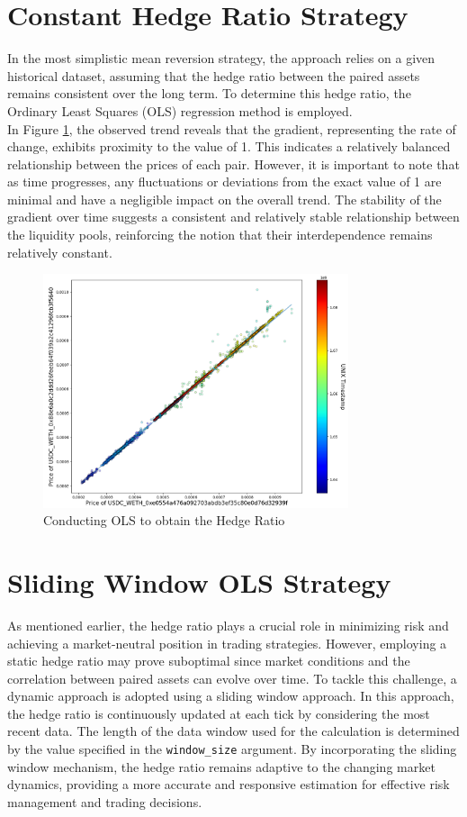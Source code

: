 \section{Constant Hedge Ratio Strategy}
In the most simplistic mean reversion strategy, the approach relies on a given historical dataset, assuming that the hedge ratio between the paired assets remains consistent over the long term. To determine this hedge ratio, the Ordinary Least Squares (OLS) regression method is employed.
\\[3mm]
In Figure \ref{fig:f1}, the observed trend reveals that the gradient, representing the rate of change, exhibits proximity to the value of 1. This indicates a relatively balanced relationship between the prices of each pair. However, it is important to note that as time progresses, any fluctuations or deviations from the exact value of 1 are minimal and have a negligible impact on the overall trend. The stability of the gradient over time suggests a consistent and relatively stable relationship between the liquidity pools, reinforcing the notion that their interdependence remains relatively constant.
\begin{figure}[!htb]
    \centering
    \includegraphics[width=0.8\textwidth]{project/Images/simple_hedge_ratio.png}
    \caption{Conducting OLS to obtain the Hedge Ratio \label{fig:f1}}
\end{figure}

\section{Sliding Window OLS Strategy}
As mentioned earlier, the hedge ratio plays a crucial role in minimizing risk and achieving a market-neutral position in trading strategies. However, employing a static hedge ratio may prove suboptimal since market conditions and the correlation between paired assets can evolve over time. To tackle this challenge, a dynamic approach is adopted using a sliding window approach. In this approach, the hedge ratio is continuously updated at each tick by considering the most recent data. The length of the data window used for the calculation is determined by the value specified in the \texttt{window\_size} argument. By incorporating the sliding window mechanism, the hedge ratio remains adaptive to the changing market dynamics, providing a more accurate and responsive estimation for effective risk management and trading decisions.

